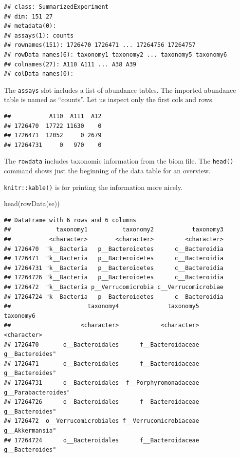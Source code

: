 \documentclass[
]{book}
\newenvironment{Shaded}{\begin{snugshade}}{\end{snugshade}}
\newcommand{\DecValTok}[1]{\textcolor[rgb]{0.00,0.00,0.81}{#1}}
\newcommand{\FunctionTok}[1]{\textcolor[rgb]{0.00,0.00,0.00}{#1}}
\newcommand{\NormalTok}[1]{#1}
\newcommand{\SpecialCharTok}[1]{\textcolor[rgb]{0.00,0.00,0.00}{#1}}
\begin{document}
\begin{verbatim}
## class: SummarizedExperiment 
## dim: 151 27 
## metadata(0):
## assays(1): counts
## rownames(151): 1726470 1726471 ... 17264756 17264757
## rowData names(6): taxonomy1 taxonomy2 ... taxonomy5 taxonomy6
## colnames(27): A110 A111 ... A38 A39
## colData names(0):
\end{verbatim}

The \texttt{assays} slot includes a list of abundance tables. The imported
abundance table is named as ``counts''. Let us inspect only the first
cols and rows.

\begin{Shaded}
\end{Shaded}

\begin{verbatim}
##           A110  A111  A12
## 1726470  17722 11630    0
## 1726471  12052     0 2679
## 17264731     0   970    0
\end{verbatim}

The \texttt{rowdata} includes taxonomic information from the biom file. The \texttt{head()} command
shows just the beginning of the data table for an overview.

\texttt{knitr::kable()} is for printing the information more nicely.

\begin{Shaded}
\begin{Highlighting}[]
\FunctionTok{head}\NormalTok{(}\FunctionTok{rowData}\NormalTok{(se))}
\end{Highlighting}
\end{Shaded}

\begin{verbatim}
## DataFrame with 6 rows and 6 columns
##             taxonomy1          taxonomy2           taxonomy3
##           <character>        <character>         <character>
## 1726470  "k__Bacteria   p__Bacteroidetes      c__Bacteroidia
## 1726471  "k__Bacteria   p__Bacteroidetes      c__Bacteroidia
## 17264731 "k__Bacteria   p__Bacteroidetes      c__Bacteroidia
## 17264726 "k__Bacteria   p__Bacteroidetes      c__Bacteroidia
## 1726472  "k__Bacteria p__Verrucomicrobia c__Verrucomicrobiae
## 17264724 "k__Bacteria   p__Bacteroidetes      c__Bacteroidia
##                      taxonomy4              taxonomy5           taxonomy6
##                    <character>            <character>         <character>
## 1726470       o__Bacteroidales      f__Bacteroidaceae     g__Bacteroides"
## 1726471       o__Bacteroidales      f__Bacteroidaceae     g__Bacteroides"
## 17264731      o__Bacteroidales  f__Porphyromonadaceae g__Parabacteroides"
## 17264726      o__Bacteroidales      f__Bacteroidaceae     g__Bacteroides"
## 1726472  o__Verrucomicrobiales f__Verrucomicrobiaceae     g__Akkermansia"
## 17264724      o__Bacteroidales      f__Bacteroidaceae     g__Bacteroides"
\end{verbatim}
\end{document}
